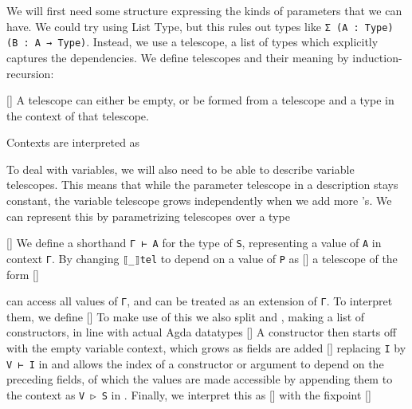 We will first need some structure expressing the kinds of parameters that we can have. We could try using List Type, but this rules out types like \texttt{Σ (A : Type) (B : A → Type)}. Instead, we use a telescope, a list of types which explicitly captures the dependencies. We define telescopes and their meaning by induction-recursion:

[]
A telescope can either be empty, or be formed from a telescope and a type in the context of that telescope.

Contexts are interpreted as

To deal with variables, we will also need to be able to describe variable telescopes. This means that while the parameter telescope in a description stays constant, the variable telescope grows independently when we add more 's. We can represent this by parametrizing telescopes over a type

[]
We define a shorthand \texttt{Γ ⊢ A} for the type of \texttt{S}, representing a value of \texttt{A} in context \texttt{Γ}. By changing \texttt{⟦\_⟧tel} to depend on a value of \texttt{P} as
[]
a telescope of the form
[]

can access all values of \texttt{Γ}, and can be treated as an extension of \texttt{Γ}. To interpret them, we define
[]
To make use of this we also split  and , making  a list of constructors, in line with actual Agda datatypes
[]
A constructor then starts off with the empty variable context, which grows as fields are added
[]
replacing \texttt{I} by \texttt{V ⊢ I} in  and  allows the index of a constructor or argument to depend on the preceding fields, of which the values are made accessible by appending them to the context as \texttt{V ▷ S} in . Finally, we interpret this as
[]
with the fixpoint
[]
